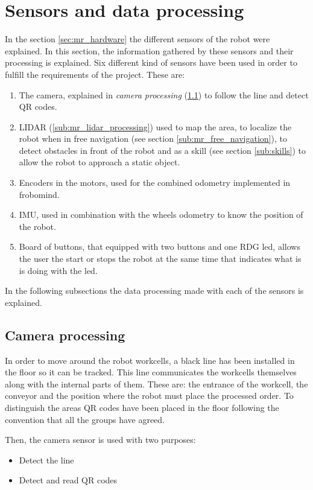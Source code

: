 \section{Sensors and data processing} %
\label{sec:mr_sensors_and_data_processing}
In the section \ref{sec:mr_hardware} the different sensors of the robot were explained.
In this section, the information gathered by these sensors and their processing is explained.
Six different kind of sensors have been used in order to fulfill the requirements of the project.
These are:
\begin{enumerate}
	\item The camera, explained in \emph{camera processing} (\ref{sub:mr_camera_processing}) to follow the line and detect QR codes.
	\item LIDAR (\ref{sub:mr_lidar_processing}) used to map the area, to localize the robot when in free navigation (see section \ref{sub:mr_free_navigation}), to detect obstacles in front of the robot and as a skill (see section \ref{sub:skills}) to allow the robot to approach a static object.
	\item Encoders in the motors, used for the combined odometry implemented in frobomind.
	\item IMU, used in combination with the wheels odometry to know the position of the robot.
	\item Board of buttons, that equipped with two buttons and one RDG led, allows the user the start or stops the robot at the same time that indicates what is is doing with the led.
\end{enumerate}
In the following subsections the data processing made with each of the sensors is explained.

	\subsection{Camera processing} %
	\label{sub:mr_camera_processing}
	In order to move around the robot workcells, a black line has been installed in the floor so it can be tracked.
	This line communicates the workcells themselves along with the internal parts of them. 
	These are: the entrance of the workcell, the conveyor and the position where the robot must place the processed order.
	To distinguish the areas QR codes have been placed in the floor following the convention that all the groups have agreed.

	Then, the camera sensor is used with two purposes:
	\begin{itemize}
		\item Detect the line
		\item Detect and read QR codes
	\end{itemize}

